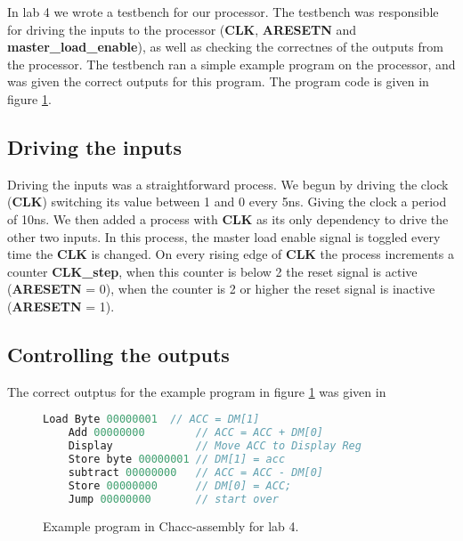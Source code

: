 In lab 4 we wrote a testbench for our processor. The testbench was responsible
for driving the inputs to the processor (\textbf{CLK}, \textbf{ARESETN} and
\textbf{master\_load\_enable}), as well as checking the correctnes of the
outputs from the processor. The testbench ran a simple example program on the
processor, and was given the correct outputs for this program. The program code
is given in figure \ref{code:lab4}. 
\subsection*{Driving the inputs}
Driving the inputs was a
straightforward process. We begun by driving the clock (\textbf{CLK})
switching its value between 1 and 0 every 5ns. Giving the clock a period of
10ns. We then added a process with \textbf{CLK} as its only dependency to drive
the other two inputs. In this process, the master load enable signal is toggled
every time the \textbf{CLK} is changed. On every rising edge of \textbf{CLK} the
process increments a counter \textbf{CLK\_step}, when this counter is below 2
the reset signal is active (\textbf{ARESETN} = 0), when the counter is 2 or
higher the reset signal is inactive (\textbf{ARESETN} = 1).
\subsection*{Controlling the outputs}
The correct outptus for the example program in figure \ref{code:lab4} was given
in 

\begin{figure}
    \caption{Example program in Chacc-assembly for lab 4.}
    \label{code:lab4}
    \centering
    \begin{lstlisting}[language=c]
    Load Byte 00000001  // ACC = DM[1]
    Add 00000000        // ACC = ACC + DM[0]
    Display             // Move ACC to Display Reg
    Store byte 00000001 // DM[1] = acc
    subtract 00000000   // ACC = ACC - DM[0]
    Store 00000000      // DM[0] = ACC;
    Jump 00000000       // start over
    \end{lstlisting}
\end{figure}